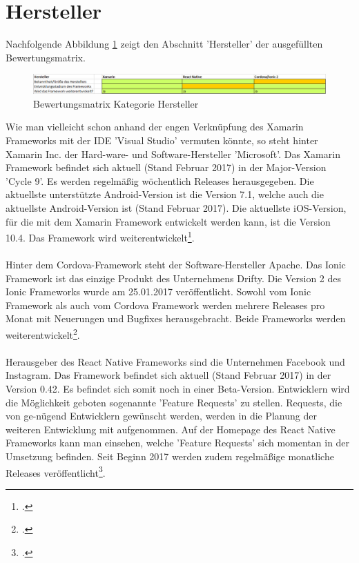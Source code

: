 \section{Hersteller}

Nachfolgende Abbildung \ref{fig:AuswHerst} zeigt den Abschnitt 'Hersteller' der ausgefüllten Bewertungsmatrix.

\begin{figure}[h]
	\centering
	\includegraphics[width=1\textwidth]{Bilder/Auswertung_Hersteller.PNG}
	\caption{Bewertungsmatrix Kategorie Hersteller}
	\label{fig:AuswHerst}
\end{figure}

Wie man vielleicht schon anhand der engen Verknüpfung des Xamarin Frameworks mit der IDE 'Visual Studio' vermuten könnte, so steht hinter Xamarin Inc. der Hard-ware- und Software-Hersteller 'Microsoft'. Das Xamarin Framework befindet sich aktuell (Stand Februar 2017) in der Major-Version 'Cycle 9'. Es werden regelmäßig wöchentlich Releases herausgegeben. Die aktuellste unterstützte Android-Version ist die Version 7.1, welche auch die aktuellste Android-Version ist (Stand Februar 2017). Die aktuellste iOS-Version, für die mit dem Xamarin Framework entwickelt werden kann, ist die Version 10.4. Das Framework wird weiterentwickelt\footcite{XamarinHomepage}. 
\\
\\
Hinter dem Cordova-Framework steht der Software-Hersteller Apache. Das Ionic Framework ist das einzige Produkt des Unternehmens Drifty. Die Version 2 des Ionic Frameworks wurde am 25.01.2017 veröffentlicht. Sowohl vom Ionic Framework als auch vom Cordova Framework werden mehrere Releases pro Monat mit Neuerungen und Bugfixes herausgebracht. Beide Frameworks werden weiterentwickelt\footcite{Cordova}. 
\\
\\ 
Herausgeber des React Native Frameworks sind die Unternehmen Facebook und Instagram. Das Framework befindet sich aktuell (Stand Februar 2017) in der Version 0.42. Es befindet sich somit noch in einer Beta-Version. Entwicklern wird die Möglichkeit geboten sogenannte 'Feature Requests' zu stellen. Requests, die von ge-nügend Entwicklern gewünscht werden, werden in die Planung der weiteren Entwicklung mit aufgenommen. Auf der Homepage des React Native Frameworks kann man einsehen, welche 'Feature Requests' sich momentan in der Umsetzung befinden. Seit Beginn 2017 werden zudem regelmäßige monatliche Releases veröffentlicht\footcite{ReactNativeHomepage}. 

